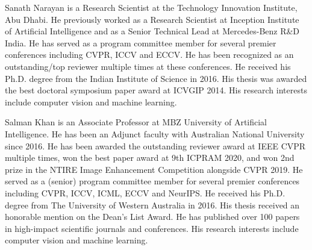 \documentclass[10pt,journal,compsoc]{IEEEtran}
\begin{document}
\vspace{-1.0cm}

\begin{IEEEbiography}{Sanath Narayan}
is a Research Scientist at the Technology Innovation Institute, Abu Dhabi. He previously worked as a Research Scientist at Inception Institute of Artificial Intelligence and as a Senior Technical Lead at Mercedes-Benz R\&D India. He has served as a program committee member for several premier conferences including CVPR, ICCV and ECCV. He has been recognized as an outstanding/top reviewer multiple times at these conferences. He received his Ph.D. degree from the Indian Institute of Science in 2016. His thesis was awarded the best doctoral symposium paper award at ICVGIP 2014. His research interests include computer vision and machine learning.
\end{IEEEbiography}

\vspace{-1.0cm}

\begin{IEEEbiography}{Salman Khan}
is an Associate Professor at MBZ University of Artificial Intelligence. He has been an Adjunct faculty with Australian National University since 2016. 
He has been awarded the outstanding reviewer award at IEEE CVPR multiple times, won the best paper award at 9th ICPRAM 2020, and won 2nd prize in the NTIRE Image Enhancement Competition alongside CVPR 2019. He served as a (senior) program committee member for several premier conferences including CVPR, ICCV, ICML, ECCV and NeurIPS. He received his Ph.D. degree from The University of Western Australia in 2016. His thesis received an honorable mention on the Dean’s List Award. He has published over 100 papers in high-impact scientific journals and conferences. His research interests include computer vision and machine learning.
\end{IEEEbiography}



\vspace{-1.0cm}
\end{document}
